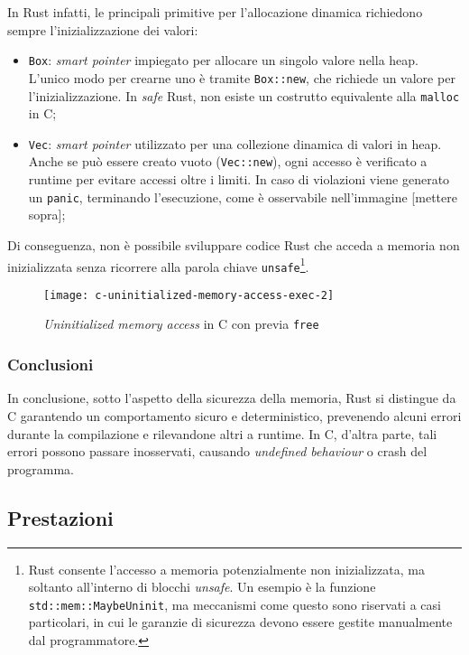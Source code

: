 In Rust infatti, le principali primitive per l'allocazione dinamica richiedono sempre l'inizializzazione dei valori:
\begin{itemize}
    \item \texttt{Box}: \textit{smart pointer} impiegato per allocare un singolo valore nella heap. L'unico modo per crearne uno è tramite \texttt{Box::new}, che richiede un valore per l'inizializzazione. In \textit{safe} Rust, non esiste un costrutto equivalente alla \texttt{malloc} in C;\ 
    \item \texttt{Vec}: \textit{smart pointer} utilizzato per una collezione dinamica di valori in heap. Anche se può essere creato vuoto (\texttt{Vec::new}), ogni accesso è verificato a runtime per evitare accessi oltre i limiti. In caso di violazioni viene generato un \texttt{panic}, terminando l'esecuzione, come è osservabile nell'immagine [mettere sopra];
\end{itemize}
Di conseguenza, non è possibile sviluppare codice Rust che acceda a memoria non inizializzata senza ricorrere alla parola chiave \texttt{unsafe}\footnote{Rust consente l'accesso a memoria potenzialmente non inizializzata, ma soltanto all'interno di blocchi \textit{unsafe}. Un esempio è la funzione \texttt{std::mem::MaybeUninit}, ma meccanismi come questo sono riservati a casi particolari, in cui le garanzie di sicurezza devono essere gestite manualmente dal programmatore.}.
\begin{figure}[htbp]
\begin{center}
    \texttt{[image: c-uninitialized-memory-access-exec-2]}
    \caption{\textit{Uninitialized memory access} in C con previa \texttt{free}}\label{c:uninitialized-memory-access-exec-2}
    \end{center}
\end{figure}

\subsubsection{Conclusioni}
In conclusione, sotto l'aspetto della sicurezza della memoria, Rust si distingue da C garantendo un comportamento sicuro e deterministico, prevenendo
alcuni errori durante la compilazione e rilevandone altri a runtime. In C, d'altra parte, tali errori possono passare inosservati, causando
\textit{undefined behaviour} o crash del programma.

\subsection{Prestazioni}


